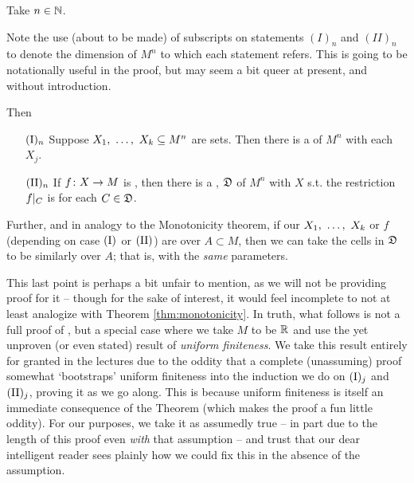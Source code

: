 \begin{theorem}[\CD]
  \label{thm:cell-decomposition}
  Take $n \in \N$.
  \begin{svgraybox}
    Note the use (about to be made) of subscripts on statements $(I)_n$ and $(II)_n$ to denote the dimension of $M^n$ to which each statement refers. This is going to be notationally useful in the proof, but may seem a bit queer at present, and without introduction.
  \end{svgraybox}
 Then
  \begin{enumerate}[label={}]
    \item[$\In$ ] Suppose $\vonevm{X}{k} \subseteq M^n$ are  sets. Then there is a \cd of $M^n$ \cmptble with each $X_j$.
    \item[$\IIn$ ] If $\funcdom{f}{X}{M}$ is , then there is a \cd, $\fancyD$ of $M^n$ \cmptble with $X$ s.t. the restriction $\funcrestr{f}{C}$ is \cont for each $C \in \fancyD$.
  \end{enumerate}

  Further, and in analogy to the Monotonicity theorem, if our $\vonevm{X}{k}$ or $f$ (depending on case $\In[]$ or $\IIn[]$) are  over $A \subset M$, then we can take the cells in  $\fancyD$ to be similarly  over $A$; that is, with the \emph{same} parameters.

  \begin{svgraybox}
    This last point is perhaps a bit unfair to mention, as we will not be providing proof for it -- though for the sake of interest, it would feel incomplete to not at least analogize with Theorem \ref{thm:monotonicity}. In truth, what follows is not a full proof of \CD, but a special case where we take $M$ to be $\R$ and use the yet unproven (or even stated) result of \emph{uniform finiteness}. We take this result entirely for granted in the lectures due to the oddity that a complete (unassuming) proof somewhat `bootstraps' uniform finiteness into the induction we do on $\In[j]$ and $\IIn[j]$, proving it as we go along. This is because uniform finiteness is itself an immediate consequence of the \CD Theorem (which makes the proof a fun little oddity). For our purposes, we take it as assumedly true -- in part due to the length of this proof even \emph{with} that assumption -- and trust that our dear intelligent reader sees plainly how we could fix this in the absence of the assumption.
  \end{svgraybox}

\end{theorem}

